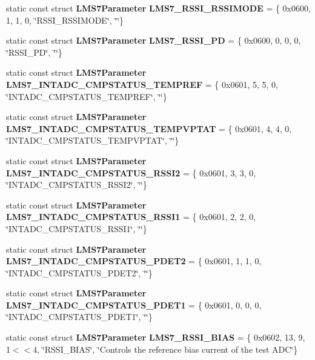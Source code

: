 \begin{DoxyCompactItemize}
\item 
static const struct {\bf L\+M\+S7\+Parameter} {\bf L\+M\+S7\+\_\+\+R\+S\+S\+I\+\_\+\+R\+S\+S\+I\+M\+O\+DE} = \{ 0x0600, 1, 1, 0, \char`\"{}\+R\+S\+S\+I\+\_\+\+R\+S\+S\+I\+M\+O\+D\+E\char`\"{}, \char`\"{}\char`\"{}\}
\item 
static const struct {\bf L\+M\+S7\+Parameter} {\bf L\+M\+S7\+\_\+\+R\+S\+S\+I\+\_\+\+PD} = \{ 0x0600, 0, 0, 0, \char`\"{}\+R\+S\+S\+I\+\_\+\+P\+D\char`\"{}, \char`\"{}\char`\"{}\}
\item 
static const struct {\bf L\+M\+S7\+Parameter} {\bf L\+M\+S7\+\_\+\+I\+N\+T\+A\+D\+C\+\_\+\+C\+M\+P\+S\+T\+A\+T\+U\+S\+\_\+\+T\+E\+M\+P\+R\+EF} = \{ 0x0601, 5, 5, 0, \char`\"{}\+I\+N\+T\+A\+D\+C\+\_\+\+C\+M\+P\+S\+T\+A\+T\+U\+S\+\_\+\+T\+E\+M\+P\+R\+E\+F\char`\"{}, \char`\"{}\char`\"{}\}
\item 
static const struct {\bf L\+M\+S7\+Parameter} {\bf L\+M\+S7\+\_\+\+I\+N\+T\+A\+D\+C\+\_\+\+C\+M\+P\+S\+T\+A\+T\+U\+S\+\_\+\+T\+E\+M\+P\+V\+P\+T\+AT} = \{ 0x0601, 4, 4, 0, \char`\"{}\+I\+N\+T\+A\+D\+C\+\_\+\+C\+M\+P\+S\+T\+A\+T\+U\+S\+\_\+\+T\+E\+M\+P\+V\+P\+T\+A\+T\char`\"{}, \char`\"{}\char`\"{}\}
\item 
static const struct {\bf L\+M\+S7\+Parameter} {\bf L\+M\+S7\+\_\+\+I\+N\+T\+A\+D\+C\+\_\+\+C\+M\+P\+S\+T\+A\+T\+U\+S\+\_\+\+R\+S\+S\+I2} = \{ 0x0601, 3, 3, 0, \char`\"{}\+I\+N\+T\+A\+D\+C\+\_\+\+C\+M\+P\+S\+T\+A\+T\+U\+S\+\_\+\+R\+S\+S\+I2\char`\"{}, \char`\"{}\char`\"{}\}
\item 
static const struct {\bf L\+M\+S7\+Parameter} {\bf L\+M\+S7\+\_\+\+I\+N\+T\+A\+D\+C\+\_\+\+C\+M\+P\+S\+T\+A\+T\+U\+S\+\_\+\+R\+S\+S\+I1} = \{ 0x0601, 2, 2, 0, \char`\"{}\+I\+N\+T\+A\+D\+C\+\_\+\+C\+M\+P\+S\+T\+A\+T\+U\+S\+\_\+\+R\+S\+S\+I1\char`\"{}, \char`\"{}\char`\"{}\}
\item 
static const struct {\bf L\+M\+S7\+Parameter} {\bf L\+M\+S7\+\_\+\+I\+N\+T\+A\+D\+C\+\_\+\+C\+M\+P\+S\+T\+A\+T\+U\+S\+\_\+\+P\+D\+E\+T2} = \{ 0x0601, 1, 1, 0, \char`\"{}\+I\+N\+T\+A\+D\+C\+\_\+\+C\+M\+P\+S\+T\+A\+T\+U\+S\+\_\+\+P\+D\+E\+T2\char`\"{}, \char`\"{}\char`\"{}\}
\item 
static const struct {\bf L\+M\+S7\+Parameter} {\bf L\+M\+S7\+\_\+\+I\+N\+T\+A\+D\+C\+\_\+\+C\+M\+P\+S\+T\+A\+T\+U\+S\+\_\+\+P\+D\+E\+T1} = \{ 0x0601, 0, 0, 0, \char`\"{}\+I\+N\+T\+A\+D\+C\+\_\+\+C\+M\+P\+S\+T\+A\+T\+U\+S\+\_\+\+P\+D\+E\+T1\char`\"{}, \char`\"{}\char`\"{}\}
\item 
static const struct {\bf L\+M\+S7\+Parameter} {\bf L\+M\+S7\+\_\+\+R\+S\+S\+I\+\_\+\+B\+I\+AS} = \{ 0x0602, 13, 9, 1$<$$<$4, \char`\"{}\+R\+S\+S\+I\+\_\+\+B\+I\+A\+S\char`\"{}, \char`\"{}\+Controls the reference bias current of the test A\+D\+C\char`\"{}\}
$$
\end{DoxyCompactItemize}
